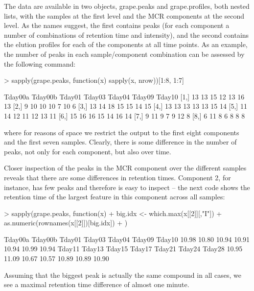 \documentclass[a4paper,11pt]{article}
\newcommand{\code}[1]{{\ttfamily #1}}
\begin{document}
The data are available in two objects, \code{grape.peaks} and
\code{grape.profiles}, both
nested lists, with the samples at the first level and the MCR
components at the second level. As the names suggest, the first
contains peaks (for each component a number of combinations of
retention time and intensity), and the second contains the elution
profiles for each of the components at all time points. As an example, 
the number of peaks in each sample/component combination can be assessed
by the following command:
\begin{Schunk}
\begin{Sinput}
> sapply(grape.peaks, function(x) sapply(x, nrow))[1:8, 1:7]
\end{Sinput}
\begin{Soutput}
     Tday00a Tday00b Tday01 Tday03 Tday04 Tday09 Tday10
[1,]      13      13     15     12     13     16     13
[2,]       9      10     10     10      7     10      6
[3,]      13      14     18     15     15     14     15
[4,]      13      13     13     13     13     15     14
[5,]      11      14     12     11     12     13     11
[6,]      15      16     16     15     14     16     14
[7,]       9      11      9      7      9     12      8
[8,]       6      11      8      6      8      8      8
\end{Soutput}
\end{Schunk}
where for reasons of space we restrict the output to the first eight
components and the first seven samples. Clearly, there is some 
difference in the number of peaks, not only for each component, but
also over time.

Closer inspection of the peaks in the MCR component over
the different samples reveals that there are some differences in
retention times. Component 2, for instance, has few peaks and
therefore is easy to inspect -- the next code shows the retention time
of the largest feature in this component across all samples:
\begin{Schunk}
\begin{Sinput}
> sapply(grape.peaks, function(x) {
+   big.idx <- which.max(x[[2]][,"I"])
+   as.numeric(rownames(x[[2]])[big.idx])
+ })
\end{Sinput}
\begin{Soutput}
Tday00a Tday00b  Tday01  Tday03  Tday04  Tday09  Tday10 
  10.98   10.80   10.94   10.91   10.94   10.99   10.94 
 Tday11  Tday13  Tday15  Tday17  Tday21  Tday24  Tday28 
  10.95   11.09   10.67   10.57   10.89   10.89   10.90 
\end{Soutput}
\end{Schunk}
Assuming that the biggest peak is actually
the same compound in all cases, we see a maximal retention time
difference of almost one minute.
\end{document}
